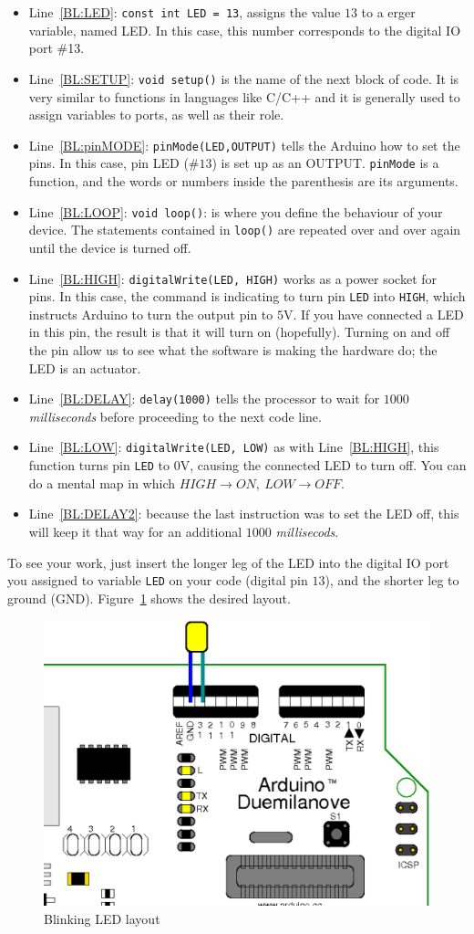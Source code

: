 \begin{itemize}
	\item Line~\ref{BL:LED}: \texttt{const int LED = 13}, assigns the value $13$ to a \texttt{\color{red}{int}}erger variable, named LED. In this case, this number corresponds to the digital IO port \#13.
	\item Line~\ref{BL:SETUP}: \texttt{void setup()} is the name of the next block of code. It is very similar to functions in languages like C/C++ and it is generally used to assign variables to ports, as well as their role.
	\item Line~\ref{BL:pinMODE}: \texttt{pinMode(LED,OUTPUT)} tells the Arduino how to set the pins. In this case, pin LED ($\#13$) is set up as an OUTPUT. \texttt{pinMode} is a function, and the words or numbers inside the parenthesis are its arguments.
	\item Line~\ref{BL:LOOP}: \texttt{void loop()}: is where you define the behaviour of your device. The statements contained in \texttt{loop()} are repeated over and over again until the device is turned off.
	\item Line~\ref{BL:HIGH}: \texttt{digitalWrite(LED, HIGH)} works as a power socket for pins. In this case, the command is indicating to turn pin \texttt{LED} into \texttt{HIGH}, which instructs Arduino to turn the output pin to $5$V. If you have connected a LED in this pin, the result is that it will turn on (hopefully). Turning on and off the pin allow us to see what the software is making the hardware do; the LED is an actuator.
	\item Line~\ref{BL:DELAY}: \texttt{delay(1000)} tells the processor to wait for $1000$ \emph{milliseconds} before proceeding to the next code line.
	\item Line~\ref{BL:LOW}: \texttt{digitalWrite(LED, LOW)} as with Line~\ref{BL:HIGH}, this function turns pin \texttt{LED} to $0$V, causing the connected LED to turn off. You can do a mental map in which $HIGH \rightarrow ON,\ LOW \rightarrow OFF$.
	\item Line~\ref{BL:DELAY2}: because the last instruction was to set the LED off, this will keep it that way for an additional $1000$ \emph{millisecods}.
\end{itemize}

To see your work, just insert the longer leg of the LED into the digital IO port you assigned to variable \texttt{LED} on your code (digital pin $13$), and the shorter leg to ground (GND). Figure~\ref{fig:blinkingLEDLayout} shows the desired layout.

\begin{figure}[htbp]
  \centering
  \includegraphics[width=0.7\linewidth]{figures/blinkingLED-scaled.eps}
  \caption{Blinking LED layout
  \label{fig:blinkingLEDLayout}}
\end{figure}
